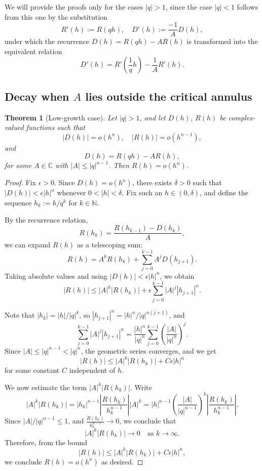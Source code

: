 \documentclass{raex}
\newtheorem{theorem}{Theorem}
\theoremstyle{definition}
\begin{document}
We will provide the proofs only for the cases \( |q| > 1 \), since the case \( |q| < 1 \) follows from this one by the substitution
\[
R'(h) := R(qh), \quad D'(h) := \frac{-1}{A} D(h),
\]
under which the recurrence \( D(h) = R(qh) - A R(h) \) is transformed into the equivalent relation
\[
D'(h) = R'\left(\frac{1}{q} h\right) - \frac{1}{A} R'(h).
\]


\subsection{Decay when \( A \) lies outside the critical annulus}

\begin{theorem}[Low-growth case]\label{th1}
Let \( |q| > 1 \), and let \( D(h) \), \( R(h) \) be complex-valued functions such that
\[
|D(h)| = o(h^n), \quad |R(h)| = o(h^{n-1}),
\]
and
\[
D(h) = R(qh) - A R(h),
\]
for some \( A \in \mathbb{C} \) with \( |A| \leq |q|^{n-1} \). Then \( R(h) = o(h^n) \).
\end{theorem}
\begin{proof}
Fix \( \epsilon > 0 \). Since \( D(h) = o(h^n) \), there exists \( \delta > 0 \) such that \( |D(h)| < \epsilon |h|^n \) whenever \( 0 < |h| < \delta \). Fix such an \( h \in (0, \delta) \), and define the sequence \( h_k := h / q^k \) for \( k \in \mathbb{N} \).

By the recurrence relation,
\[
R(h_k) = \frac{R(h_{k-1}) - D(h_k)}{A},
\]
we can expand \( R(h) \) as a telescoping sum:
\[
R(h) = A^k R(h_k) + \sum_{j = 0}^{k - 1} A^j D(h_{j+1}).
\]
Taking absolute values and using \( |D(h)| < \epsilon |h|^n \), we obtain
\[
|R(h)| \leq |A|^k |R(h_k)| + \epsilon \sum_{j = 0}^{k - 1} |A|^j |h_{j+1}|^n.
\]

Note that \( |h_k| = |h| / |q|^k \), so \( |h_{j+1}|^n = |h|^n / |q|^{n(j+1)} \), and
\[
\sum_{j = 0}^{k - 1} |A|^j |h_{j+1}|^n =\frac{|h|^n}{|q|^n} \sum_{j = 0}^{k - 1} \left( \frac{|A|}{|q|^n} \right)^j.
\]
Since \( |A| \leq |q|^{n-1} < |q|^n \), the geometric series converges, and we get
\[
|R(h)| \leq |A|^k |R(h_k)| + C \epsilon |h|^n
\]
for some constant \( C \) independent of \( h \).

We now estimate the term \( |A|^k |R(h_k)| \). Write
\[
|A|^k |R(h_k)| = |h_k|^{n-1} \left| \frac{R(h_k)}{h_k^{n-1}} \right| |A|^k = |h|^{n-1} \left( \frac{|A|}{|q|^{n-1}} \right)^k \left| \frac{R(h_k)}{h_k^{n-1}} \right|.
\]
Since \( |A| / |q|^{n-1} \leq 1 \), and \( \frac{R(h_k)}{h_k^{n-1}} \to 0 \), we conclude that
\[
|A|^k |R(h_k)| \to 0 \quad \text{as } k \to \infty.
\]
Therefore, from the bound
\[
|R(h)| \leq |A|^k |R(h_k)| + C \epsilon |h|^n,
\]
we conclude \( R(h) = o(h^n) \) as desired.

\end{proof}
\end{document}
